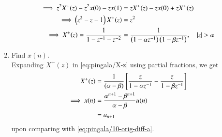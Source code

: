 \documentclass[journal,12pt,twocolumn]{IEEEtran}
\renewcommand\thesection{\arabic{section}}
\begin{document}
\begin{enumerate}[label=\thesection.\arabic*,ref=\thesection.\theenumi]
\begin{align}
\implies     z^2X^+(z) - z^2x(0) - zx(1) &= zX^+(z) - zx(0) + zX^+(z) \\
 \implies   \brak{z^2 - z - 1}X^+(z) &= z^2 \\
  \implies    X^+(z) = \frac{1}{1 - z^{-1} - z^{-2}} 
    &= \frac{1}{\brak{1 - \alpha z^{-1}}\brak{1 - \beta z^{-1}}}, \quad |z| > \alpha
    \label{eq:pingala/X-z}
\end{align}
\item Find $x(n)$.
\\
\solution Expanding $X^+(z)$ in \eqref{eq:pingala/X-z} using partial fractions, we get
\begin{align}
    X^+(z) &= \frac{1}{\brak{\alpha - \beta}}\sbrak{\frac{z}{1 - \alpha z^{-1}} - \frac{z}{1 - \beta z^{-1}}} \\
	\implies    x(n) &= \frac{\alpha^{n + 1} - \beta^{n + 1}}{\alpha - \beta}u(n) 
	\\
	&= a_{n + 1}
    \label{eq:pingala/x-n-def}
\end{align}
upon comparing with
	\eqref{eq:pingala/10-orig-diff-a}.
\end{enumerate}
\end{document}

